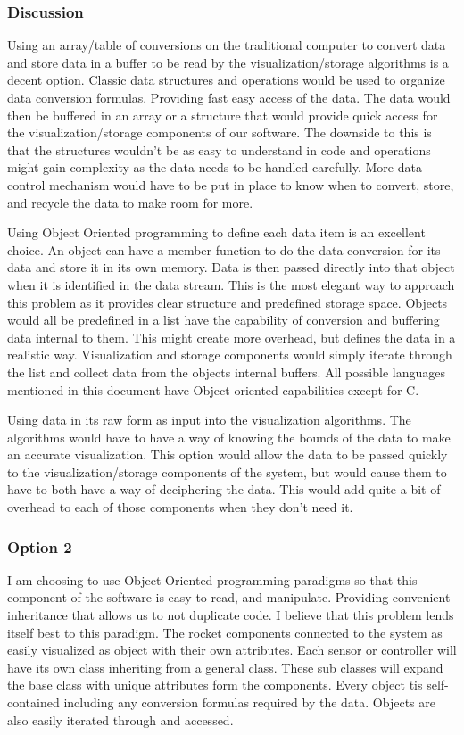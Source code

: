 \documentclass[10pt,draftclsnofoot,onecolumn,retainorgcmds]{IEEEtran}
\begin{document}
\subsubsection{Discussion}
Using an array/table of conversions on the traditional computer to convert data and store data in a buffer to be read by the visualization/storage algorithms is a decent option. Classic data structures and operations would be used to organize data conversion formulas. Providing fast easy access of the data. The data would then be buffered in an array or a structure that would provide quick access for the visualization/storage components of our software. The downside to this is that the structures wouldn't be as easy to understand in code and operations might gain complexity as the data needs to be handled carefully. More data control mechanism would have to be put in place to know when to convert, store, and recycle the data to make room for more.\par
Using Object Oriented programming to define each data item is an excellent choice. An object can have a member function to do the data conversion for its data and store it in its own memory. Data is then passed directly into that object when it is identified in the data stream. This is the most elegant way to approach this problem as it provides clear structure and predefined storage space. Objects would all be predefined in a list have the capability of conversion and buffering data internal to them. This might create more overhead, but defines the data in a realistic way. Visualization and storage components would simply iterate through the list and collect data from the objects internal buffers. All possible languages mentioned in this document have Object oriented capabilities except for C. \par
Using data in its raw form as input into the visualization algorithms. The algorithms would have to have a way of knowing the bounds of the data to make an accurate visualization. This option would allow the data to be passed quickly to the visualization/storage components of the system, but would cause them to have to both have a way of deciphering the data. This would add quite a bit of overhead to each of those components when they don't need it. \\

\subsubsection{Option 2}
I am choosing to use Object Oriented programming paradigms so that this component of the software is easy to read, and manipulate. Providing convenient inheritance that allows us to not duplicate code. I believe that this problem lends itself best to this paradigm. The rocket components connected to the system as easily visualized as object with their own attributes. Each sensor or controller will have its own class inheriting from a general class. These sub classes will expand the base class with unique attributes form the components. Every object tis self-contained including any conversion formulas required by the data. Objects are also easily iterated through and accessed. 
\end{document}
